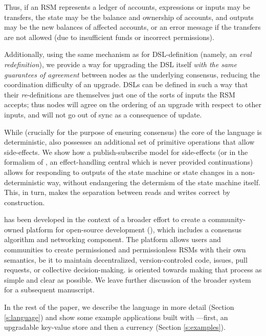 Thus, if an RSM represents a ledger of accounts, expressions or inputs may be transfers, the
state may be the balance and ownership of accounts, and outputs may be the new
balances of affected accounts, or an error message if the transfers are not
allowed (due to insufficient funds or incorrect permissions).

Additionally, using the same mechanism as for DSL-definition (namely, an
\emph{eval redefinition}), we provide a way for upgrading the DSL itself
\emph{with the same guarantees of agreement} between nodes as the underlying
consensus, reducing the coordination difficulty of an upgrade. DSLs can be
defined in such a way that their \emph{re}-definitions are themselves just one of the
sorts of inputs the RSM accepts; thus nodes will agree on the ordering of an
upgrade with respect to other inputs, and will not go out of sync as a
consequence of update.

While (crucially for the purpose of ensuring consensus) the core of the language
is deterministic, \rad{} also possesses an additional set of primitive operations
that allow side-effects. We show how a publish-subscribe model for side-effects
(or in the formalism of \cite{Cartwright1994}, an effect-handling central which
is never provided continuations) allows for responding to outputs of the state
machine or state changes in a non-deterministic way, without endangering the
determism of the state machine itself. This, in turn, makes the separation between
reads and writes correct by construction.

\rad{} has been developed in the context of a broader effort to create a
community-owned platform for open-source development (\oscoin{}), which
includes a consensus algorithm and networking component. The \oscoin{}
platform allows users and communities to create permissioned and permissionless
RSMs with their own semantics, be it to maintain decentralized,
version-controled code, issues, pull requests, or collective decision-making.
\rad{} is
oriented towards making that process as simple and clear as possible. We leave further
discussion of the broader \oscoin{} system for a subsequent manuscript.

In the rest of the paper, we describe the language in more detail (Section
\ref{s:language}) and show some example applications built with \rad{}---first,
an upgradable key-value store and then a currency
(Section \ref{s:examples}).
